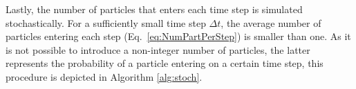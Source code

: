 Lastly, the number of particles that enters each time step is simulated stochastically. For a sufficiently small time step $\Delta t$, the average number of particles entering each step (Eq.\ \eqref{eq:NumPartPerStep}) is smaller than one. As it is not possible to introduce a non-integer number of particles, the latter represents the probability of a particle entering on a certain time step, this procedure is depicted in Algorithm \ref{alg:stoch}. \par

